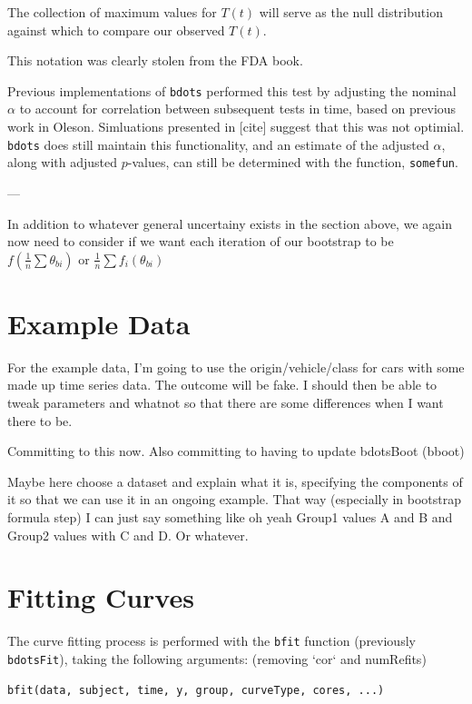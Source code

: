 \documentclass{article}
\begin{document}
The collection of maximum values for $T(t)$ will serve as the null distribution against which to compare our observed $T(t)$.

This notation was clearly stolen from the FDA book. 

Previous implementations of \texttt{bdots} performed this test by adjusting the nominal $\alpha$ to account for correlation between subsequent tests in time, based on previous work in Oleson. Simluations presented in [cite] suggest that this was not optimial. \texttt{bdots} does still maintain this functionality, and an estimate of the adjusted $\alpha$, along with adjusted $p$-values, can still be determined with the function, \texttt{somefun}.


---

In addition to whatever general uncertainy exists in the section above, we again now need to consider if we want each iteration of our bootstrap to be $f ( \frac1n \sum \theta_{bi})$ or $ \frac1n \sum f_i (\theta_{bi})$

\section{Example Data}

For the example data, I'm going to use the origin/vehicle/class for cars with some made up time series data. The outcome will be fake. I should then be able to tweak parameters and whatnot so that there are some differences when I want there to be. 

Committing to this now. Also committing to having to update bdotsBoot (bboot)

Maybe here choose a dataset and explain what it is, specifying the components of it so that we can use it in an ongoing example. That way (especially in bootstrap formula step) I can just say something like oh yeah Group1 values A and B and Group2 values with C and D. Or whatever. 

\section{Fitting Curves}

The curve fitting process is performed with the \texttt{bfit} function (previously \texttt{bdotsFit}), taking the following arguments: (removing `cor` and numRefits)

\begin{center}
\begin{verbatim}
bfit(data, subject, time, y, group, curveType, cores, ...)
\end{verbatim}
\end{center}
\end{document}
